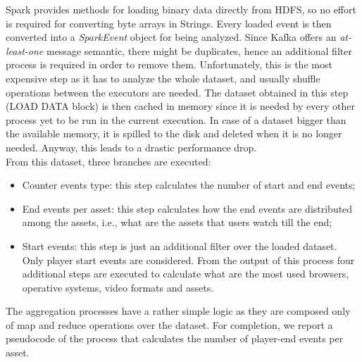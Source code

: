 Spark provides methods for loading binary data directly from HDFS, so no effort is required for converting byte arrays in Strings. Every loaded event is then converted into a \textit{SparkEvent} object for being analyzed. 
Since Kafka offers an \textit{at-least-one} message semantic, there might be duplicates, hence an additional filter process is required in order to remove them. Unfortunately, this is the most expensive step as it has to analyze the whole dataset, and usually shuffle operations between the executors are needed. The dataset obtained in this step (LOAD DATA block) is then cached in memory since it is needed by every other process yet to be run in the current execution. In case of a dataset bigger than the available memory, it is spilled to the disk and deleted when it is no longer needed. Anyway, this leads to a drastic performance drop.\\
From this dataset, three branches are executed:
\begin{itemize}
\item Counter events type: this step calculates the number of start and end events; 
\item End events per asset: this step calculates how the end events are distributed among the assets, i.e., what are the assets that users watch till the end;
\item Start events: this step is just an additional filter over the loaded dataset. Only player start events are considered. From the output of this process four additional steps are executed to calculate what are the most used browsers, operative systems, video formats and assets.
\end{itemize} 

The aggregation processes have a rather simple logic as they are composed only of map and reduce operations over the dataset. For completion, we report a pseudocode of the process that calculates the number of player-end events per asset. \\

